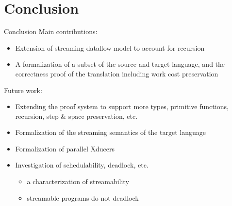 \documentclass{beamer}
\begin{document}
\section{Conclusion}

\begin{frame}{Conclusion}
\small
	Main contributions:
	\begin{itemize}
		\item Extension of streaming dataflow model to account for recursion 
		\item A formalization of a subset of the source and target language, and the correctness proof of the translation including work cost preservation
	\end{itemize}

\pause	Future work:
	\begin{itemize}
	\item Extending the proof system to support more types, primitive functions, recursion, step \& space preservation, etc.
	\item Formalization of the streaming semantics of the target language
	\item Formalization of parallel Xducers
	\item Investigation of schedulability, deadlock, etc.
	  \begin{itemize}
	  	\item a characterization of streamability 
	  	\item streamable programs do not deadlock
	  \end{itemize}
	\end{itemize}
\end{frame}

\end{document}
